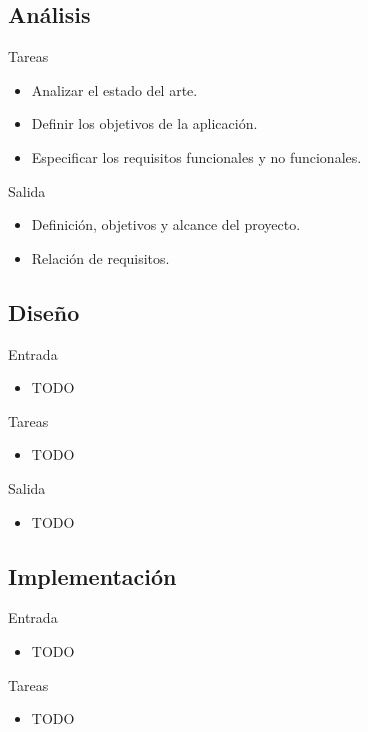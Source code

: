 \subsection*{Análisis\label{ssec:dp:analisis}}

Tareas
\begin{itemize}[leftmargin=3.5em]
  \item Analizar el estado del arte.
  \item Definir los objetivos de la aplicación.
  \item Especificar los requisitos funcionales y no funcionales.
\end{itemize}

Salida
\begin{itemize}[leftmargin=3.5em]
  \item Definición, objetivos y alcance del proyecto.
  \item Relación de requisitos.
\end{itemize}

\subsection*{Diseño\label{ssec:dp:disenho}}

Entrada
\begin{itemize}[leftmargin=3.5em]
  \item TODO
\end{itemize}

Tareas
\begin{itemize}[leftmargin=3.5em]
  \item TODO
\end{itemize}

Salida
\begin{itemize}[leftmargin=3.5em]
  \item TODO
\end{itemize}

\subsection*{Implementación\label{ssec:dp:implementacion}}

Entrada
\begin{itemize}[leftmargin=3.5em]
  \item TODO
\end{itemize}

Tareas
\begin{itemize}[leftmargin=3.5em]
  \item TODO
\end{itemize}

